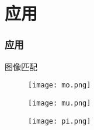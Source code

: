 \documentclass[notheorems,mathserif,table,compress]{beamer}  %
\begin{document}
\section{应用} 
\begin{frame}
\frametitle{应用}
 图像匹配

   \begin{figure}[!ht]
    \begin{minipage}{0.2\textwidth}
    \centering
    \texttt{[image: mo.png]}
    \end{minipage}
    \begin{minipage}{0.2\textwidth}
    \centering
    \texttt{[image: mu.png]}
    \end{minipage}
   \end{figure}
   \begin{figure}[!ht]
    \centering
    \texttt{[image: pi.png]}
   \end{figure}
\end{frame}
\end{document}
